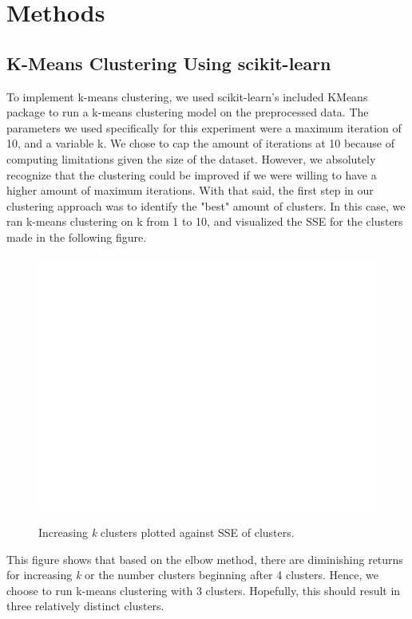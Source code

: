 \documentclass{article}
\begin{document}
\section{Methods}
\subsection{K-Means Clustering Using scikit-learn}
To implement k-means clustering, we used scikit-learn's included KMeans package to run a k-means clustering model on the preprocessed data. The parameters we used specifically for this experiment were a maximum iteration of 10, and a variable k. We chose to cap the amount of iterations at 10 because of computing limitations given the size of the dataset. However, we absolutely recognize that the clustering could be improved if we were willing to have a higher amount of maximum iterations. With that said, the first step in our clustering approach was to identify the "best" amount of clusters. In this case, we ran k-means clustering on k from 1 to 10, and visualized the SSE for the clusters made in the following figure.

\begin{figure}[h!]
    \centering
    \caption{Increasing \textit{k} clusters plotted against SSE of clusters.}
    \includegraphics[scale = 0.8]{elbow.png}    
    \label{fig:my_label}
\end{figure}

This figure shows that based on the elbow method, there are diminishing returns for increasing \textit{k} or the number clusters beginning after 4 clusters. Hence, we choose to run k-means clustering with 3 clusters. Hopefully, this should result in three relatively distinct clusters. 
\end{document}
